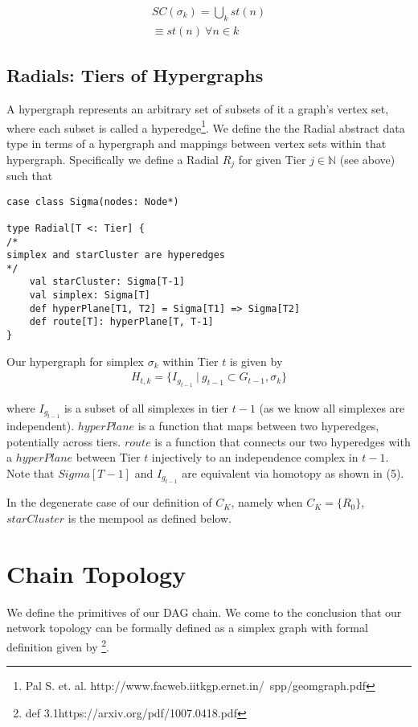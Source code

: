 \documentclass{article}
\begin{document}
\begin{equation} \label{eq1}
\begin{split}
SC(\sigma_k) = \bigcup_k st(n) \\
\equiv st(n) \ \forall n \in k
\end{split}
\end{equation}

\subsection{Radials: Tiers of Hypergraphs}
A hypergraph represents an arbitrary set of subsets of it a graph's vertex set, where each subset is called a hyperedge\footnote{Pal S. et. al. http://www.facweb.iitkgp.ernet.in/~spp/geomgraph.pdf}. We define the the Radial abstract data type in terms of a hypergraph and mappings between vertex sets within that hypergraph. Specifically we define a Radial $R_j$ for given Tier $j \in \mathbb{N}$ (see above) such that

\begin{lstlisting}
case class Sigma(nodes: Node*)

type Radial[T <: Tier] {
/*
simplex and starCluster are hyperedges
*/
	val starCluster: Sigma[T-1]
	val simplex: Sigma[T]
	def hyperPlane[T1, T2] = Sigma[T1] => Sigma[T2]
	def route[T]: hyperPlane[T, T-1]
}
\end{lstlisting}

Our hypergraph for simplex $\sigma_k$ within Tier $t$ is given by
\begin{equation} \label{eq1}
\begin{split}
H_{t,k} = \{I_{g_{t-1}} \ | \ g_{t-1} \subset G_{t-1}, \sigma_k \}
\end{split}
\end{equation}

where $I_{g_{t-1}}$ is a subset of all simplexes in tier $t-1$ (as we know all simplexes are independent). $hyperPlane$ is a function that maps between two hyperedges, potentially across tiers. $route$ is a function that connects our two hyperedges with a $hyperPlane$ between Tier $t$ injectively to an independence complex in $t-1$. Note that $Sigma[T-1]$ and $I_{g_{t-1}}$ are equivalent via homotopy as shown in (5). 

In the degenerate case of our definition of $C_K$, namely when $C_K = \{R_0\}$, $starCluster$ is the mempool as defined below.

\section{Chain Topology}
We define the primitives of our DAG chain. We come to the conclusion that our network topology can be formally defined as a simplex graph with formal definition given by \footnote{def 3.1https://arxiv.org/pdf/1007.0418.pdf}.
\end{document}

